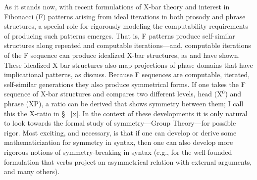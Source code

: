 \documentclass[11pt,twoside]{article}
\theoremstyle{plain}
\numberwithin{equation}{section}
\theoremstyle{definition}
\newtheorem{phrase string}{Phrase String}
\begin{document}
As it stands now, with recent formulations of X-bar theory and interest in Fibonacci (F) patterns arising from ideal iterations in both prosody and phrase structures, a special role for rigorously modeling the computability requirements of producing such patterns emerges. That is, F patterns produce self-similar structures along repeated and computable iterations---and, computable iterations of the F sequence can produce idealized X-bar structures, as \cite{medeiros:2008} and \cite{soschen:2008} have shown. These idealized X-bar structures also map projections of phase domains that have implicational patterns, as \cite{ppuriagereka:2008} discuss. Because F sequences are computable, iterated, self-similar generations they also produce symmetrical forms. If one takes the F sequence of X-bar structures and compares two different levels, head (X$^{0}$) and phrase (XP), a ratio can be derived that shows symmetry between them; I call this the X-ratio in \S~ \ref{x}. In the context of these developments it is only natural to look towards the formal study of symmetry---Group Theory---for possible rigor. Most exciting, and necessary, is that if one can develop or derive some mathematicization for symmetry in syntax, then one can also develop more rigorous notions of symmetry-breaking in syntax (e.g., for the well-founded formulation that verbs project an asymmetrical relation with external arguments, and many others). 
\end{document}
